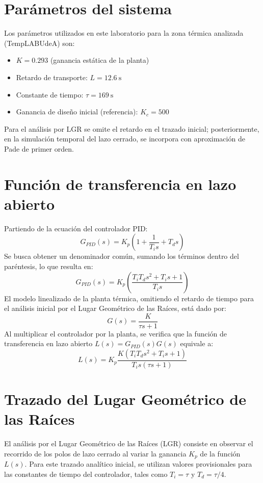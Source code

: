 \documentclass[letterpaper,12pt]{article}
\begin{document}
\section*{Parámetros del sistema}
Los parámetros utilizados en este laboratorio para la zona térmica analizada (TempLABUdeA) son:
\begin{itemize}
    \item $K = 0.293$ (ganancia estática de la planta)
    \item Retardo de transporte: $L = 12.6\ \mathrm{s}$
    \item Constante de tiempo: $\tau = 169\ \mathrm{s}$
    \item Ganancia de diseño inicial (referencia): $K_c = 500$
\end{itemize}

Para el análisis por LGR se omite el retardo en el trazado inicial; posteriormente, en la simulación temporal del lazo cerrado, se incorpora con aproximación de Pade de primer orden.

\section{Función de transferencia en lazo abierto}
Partiendo de la ecuación del controlador PID:
\begin{equation}
G_{PID}(s) = K_p \left( 1 + \frac{1}{T_i s} + T_d s \right) 
\end{equation}
Se busca obtener un denominador común, sumando los términos dentro del paréntesis, lo que resulta en:
\begin{equation}
G_{PID}(s) = K_p \left( \frac{T_i T_d s^2 + T_i s + 1}{T_i s} \right)
\end{equation}
El modelo linealizado de la planta térmica, omitiendo el retardo de tiempo para el análisis inicial por el Lugar Geométrico de las Raíces, está dado por:
\begin{equation}
G(s) = \frac{K}{\tau s + 1}
\end{equation}
Al multiplicar el controlador por la planta, se verifica que la función de transferencia en lazo abierto $L(s) = G_{PID}(s)G(s)$ equivale a:
\begin{equation}
L(s) = K_p \frac{K(T_i T_d s^2 + T_i s + 1)}{T_i s(\tau s + 1)} 
\end{equation}

\section{Trazado del Lugar Geométrico de las Raíces}
El análisis por el Lugar Geométrico de las Raíces (LGR) consiste en observar el recorrido de los polos de lazo cerrado al variar la ganancia $K_p$ de la función $L(s)$. Para este trazado analítico inicial, se utilizan valores provisionales para las constantes de tiempo del controlador, tales como $T_i = \tau$ y $T_d = \tau/4$. 
\end{document}
